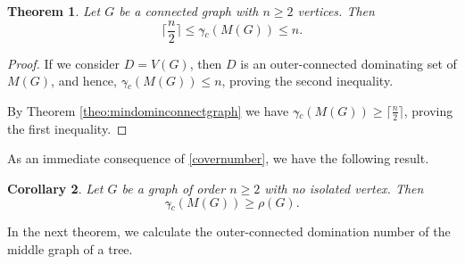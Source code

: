 \documentclass[a4paper,12pt, reqno]{amsart}
\newtheorem{Theorem}{Theorem}[section]
\newtheorem{Corollary}[Theorem]{Corollary}
\begin{document}
\begin{Theorem}\label{theo:mindomintree}
Let $G$ be a connected graph with $n\ge2$ vertices. Then $$\lceil\frac{n}{2}\rceil\le\gamma{\tilde{}} _{c}(M(G))\le n.$$
\end{Theorem}
\begin{proof} 
	If we consider $D=V(G)$, then $D$ is an outer-connected dominating set of $M(G)$, and hence, $\gamma{\tilde{}} _{c}(M(G))\le n$,  proving the second inequality.
	
	By Theorem \ref{theo:mindominconnectgraph} we have $\gamma{\tilde{}} _{c}(M(G)) \ge \lceil\frac{n}{2}\rceil$,  proving the first inequality.
	\end{proof}
As an immediate consequence of \ref{covernumber}, we have the following result.
\begin{Corollary}
	Let $G$ be a graph of order $n\geq 2$ with no isolated vertex. Then $$\gamma{\tilde{}} _{c}(M(G)) \ge \rho(G).$$
\end{Corollary}	
In the next theorem, we calculate the outer-connected domination number of the middle graph of a tree.%
\end{document}
